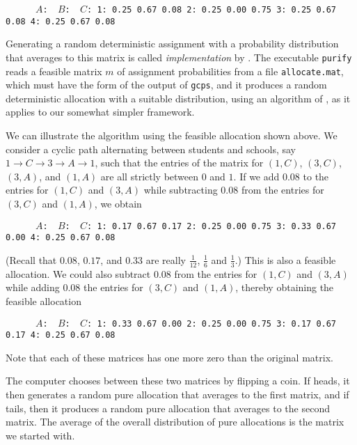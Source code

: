 \documentclass[12pt]{article}
\theoremstyle{definition}
\begin{document}
\begin{obeylines}\texttt{
\ \ \ \ \ $A$:    \     $B$:  \      $C$:
1:      0.25     0.67     0.08
2:      0.25     0.00     0.75
3:      0.25     0.67     0.08
4:      0.25     0.67     0.08
}
\end{obeylines} \noindent

\medskip
Generating a random deterministic assignment with a probability
distribution that averages to this matrix is called
\emph{implementation} by \cite{bckm13aer}.  The executable
\texttt{purify} reads a feasible matrix $m$ of assignment
probabilities from a file \texttt{allocate.mat}, which must have the
form of the output of \texttt{gcps}, and it produces a random
deterministic allocation with a suitable distribution, using an
algorithm of \cite{bckm13aer}, as it applies to our somewhat simpler
framework.

We can illustrate the algorithm using the feasible allocation shown
above.  We consider a cyclic path alternating between students and
schools, say $1 \to C \to 3 \to A \to 1$, such that the entries of the
matrix for $(1,C)$, $(3,C)$, $(3,A)$, and $(1,A)$ are all strictly
between $0$ and $1$.  If we add $0.08$ to the entries for $(1,C)$ and
$(3,A)$ while subtracting $0.08$ from the entries for $(3,C)$ and
$(1,A)$, we obtain
\begin{obeylines}\texttt{
\ \ \ \ \ $A$:    \     $B$:  \  $C$:
1:      0.17     0.67     0.17
2:      0.25     0.00     0.75
3:      0.33     0.67     0.00
4:      0.25     0.67     0.08
}
\end{obeylines} \noindent
(Recall that $0.08$, $0.17$, and $0.33$ are really $\tfrac{1}{12}$,
$\tfrac16$ and $\tfrac13$.)  This is also a feasible allocation.  We
could also subtract $0.08$ from the entries for $(1,C)$ and $(3,A)$
while adding $0.08$ the entries for $(3,C)$ and $(1,A)$, thereby
obtaining the feasible allocation
\begin{obeylines}\texttt{
\ \ \ \ \ $A$:    \     $B$:  \      $C$:
1:      0.33     0.67     0.00
2:      0.25     0.00     0.75
3:      0.17     0.67     0.17
4:      0.25     0.67     0.08
}
\end{obeylines} \noindent
Note that each of these matrices has one more zero than the original matrix.

The computer chooses between these two matrices by flipping a coin.
If heads, it then generates a random pure allocation that averages to
the first matrix, and if tails, then it produces a random pure
allocation that averages to the second matrix.  The average of the
overall distribution of pure allocations is the matrix we started
with.
\end{document}
